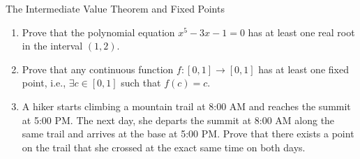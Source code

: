 \begin{exercise}{The Intermediate Value Theorem and Fixed Points}
\begin{enumerate}[leftmargin=1.5em,itemsep=2pt]
  \item Prove that the polynomial equation $x^5 - 3x - 1 = 0$ has at least one real root in the interval $(1, 2)$.
  \item Prove that any continuous function $f: [0, 1] \to [0, 1]$ has at least one fixed point, i.e., $\exists c \in [0, 1]$ such that $f(c) = c$.
  \item A hiker starts climbing a mountain trail at 8:00 AM and reaches the summit at 5:00 PM. The next day, she departs the summit at 8:00 AM along the same trail and arrives at the base at 5:00 PM.
  Prove that there exists a point on the trail that she crossed at the exact same time on both days.
\end{enumerate}
\end{exercise}

\begin{tabletworkspace}[5.0cm]
\end{tabletworkspace}


